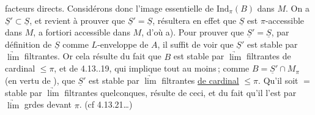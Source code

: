 facteurs directs. Considérons donc l'image essentielle  de $\mathrm{Ind}_\pi(B)$ dans $M$. On a $\underline S'\subset\underline S$, et  revient à prouver que $\underline S'=\underline S$,   résultera en effet que $\underline S$ est $\pi$-accessible dans $M$, a fortiori accessible dans $M$, d'où a). Pour prouver que $\underline S'=\underline S$, par définition de $\underline S$ comme  $L$-enveloppe de $A$, il suffit de voir que $\underline S'$ est stable par  $\underrightarrow{\lim}$ filtrantes. Or cela résulte du fait que $B$  est stable  par  $\underrightarrow{\lim}$ filtrantes de cardinal $\leq\pi$, et de 4.13..19, qui implique tout au moins\,;  comme $B=\underline S'\cap M_\pi$ (en vertu de ), que $\underline S'$ est stable par $\underrightarrow{\lim}$ filtrantes \uline{de cardinal} $\leq\pi$. Qu'il soit $=$ stable par  $\underrightarrow{\lim}$ filtrantes quelconques, résulte de ceci, et du fait qu'il l'est par $\underrightarrow{\lim}$ grdes devant $\pi$. (cf 4.13.21\ldots)
